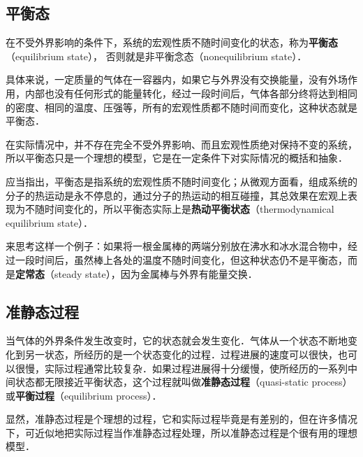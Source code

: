 
\subsection{平衡态}

在不受外界影响的条件下，系统的宏观性质不随时间变化的状态，称为\textbf{平衡态}（equilibrium state）， 否则就是非平衡念态（nonequilibrium state）．

具体来说，一定质量的气体在一容器内，如果它与外界没有交换能量，没有外场作用，内部也没有任何形式的能量转化，经过一段时间后，气体各部分终将达到相同的密度、相同的温度、压强等，所有的宏观性质都不随时间而变化，这种状态就是平衡态．

在实际情况中，并不存在完全不受外界影响、而且宏观性质绝对保持不变的系统，所以平衡态只是一个理想的模型，它是在一定条件下对实际情况的概括和抽象．

应当指出，平衡态是指系统的宏观性质不随时间变化；从微观方面看，组成系统的分子的热运动是永不停息的，通过分子的热运动的相互碰撞，其总效果在宏观上表现为不随时间变化的，所以平衡态实际上是\textbf{热动平衡状态}（thermodynamical equilibrium state）．

来思考这样一个例子：如果将一根金属棒的两端分别放在沸水和冰水混合物中，经过一段时间后，虽然棒上各处的温度不随时间变化，但这种状态仍不是平衡态，而是\textbf{定常态}（steady state），因为金属棒与外界有能量交换．

\subsection{准静态过程}

当气体的外界条件发生改变时，它的状态就会发生变化．气体从一个状态不断地变化到另一状态，所经历的是一个状态变化的过程．过程进展的速度可以很快，也可以很慢，实际过程通常比较复杂．如果过程进展得十分缓慢，使所经历的一系列中间状态都无限接近平衡状态，这个过程就叫做\textbf{准静态过程}（quasi-static process）或\textbf{平衡过程}（equilibrium process）．

显然，准静态过程是个理想的过程，它和实际过程毕竟是有差别的，但在许多情况下，可近似地把实际过程当作准静态过程处理，所以准静态过程是个很有用的理想模型．